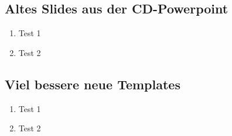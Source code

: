 \documentclass{beamer}
\begin{document}
\subsection{Altes Slides aus der CD-Powerpoint}
\begin{frame}
    \begin{enumerate}
        \item Test 1
        \item Test 2
    \end{enumerate}
\end{frame}


\subsection{Viel bessere neue Templates}
\begin{frame}
    \begin{enumerate}
        \item Test 1
        \item Test 2
    \end{enumerate}
\end{frame}
\end{document}
